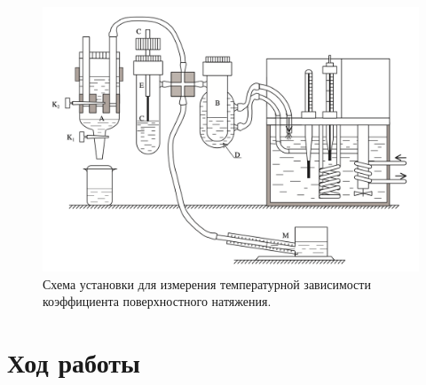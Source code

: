 \documentclass[a4paper,12pt]{article} %
\begin{document}
	\begin{figure}[h!]
		\centering
    \includegraphics[scale = 0.75]{setup.png}
		\caption{Схема установки для измерения температурной зависимости коэффициента поверхностного натяжения.}
		\label{fig:setup}
	\end{figure}

\section*{Ход работы}
\end{document}
